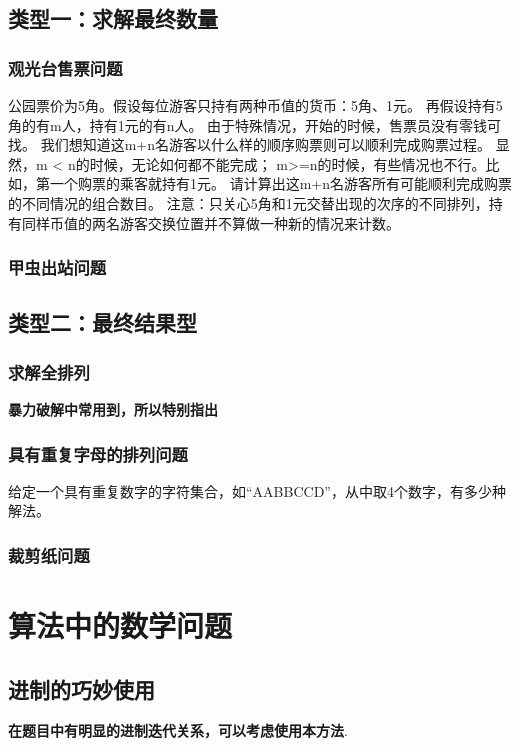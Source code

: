 \documentclass[a4paper]{article}
\begin{document}
	\subsection{类型一：求解最终数量}
	\subsubsection{观光台售票问题}
	公园票价为5角。假设每位游客只持有两种币值的货币：5角、1元。
	再假设持有5角的有m人，持有1元的有n人。
	由于特殊情况，开始的时候，售票员没有零钱可找。
	我们想知道这m+n名游客以什么样的顺序购票则可以顺利完成购票过程。
	显然，m < n的时候，无论如何都不能完成；
	m>=n的时候，有些情况也不行。比如，第一个购票的乘客就持有1元。
	请计算出这m+n名游客所有可能顺利完成购票的不同情况的组合数目。
	注意：只关心5角和1元交替出现的次序的不同排列，持有同样币值的两名游客交换位置并不算做一种新的情况来计数。
	
	\subsubsection{甲虫出站问题}
	
	\subsection{类型二：最终结果型}
	\subsubsection{求解全排列}
	\textbf{暴力破解中常用到，所以特别指出}
	
	\subsubsection{具有重复字母的排列问题}
	给定一个具有重复数字的字符集合，如“AABBCCD”，从中取4个数字，有多少种解法。
	
	\subsubsection{裁剪纸问题}
	
	
	\section{算法中的数学问题}
	\subsection{进制的巧妙使用}
	\textbf{在题目中有明显的进制迭代关系，可以考虑使用本方法}.
\end{document}
